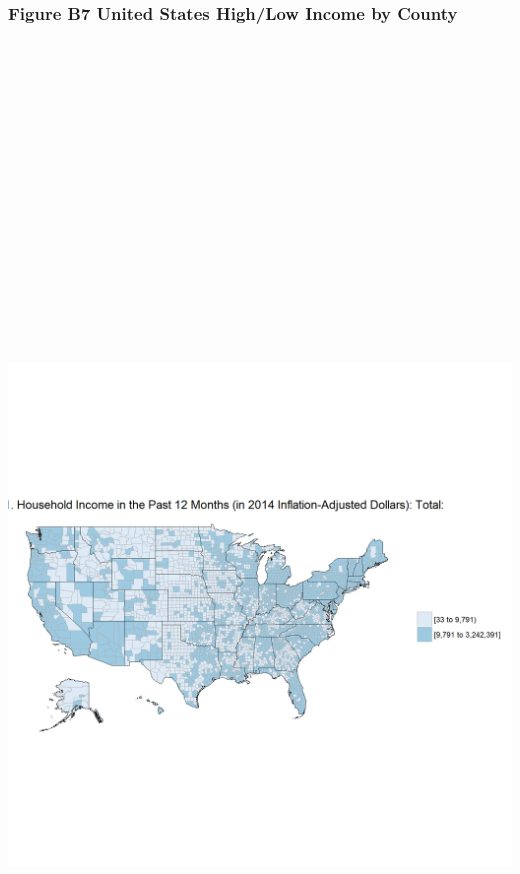 \documentclass[]{article}
\begin{document}
\newpage

\subsubsection{Figure B7 United States High/Low Income by
County}\label{figure-b7-united-states-highlow-income-by-county}

\section{\texorpdfstring{\protect\includegraphics[height=12.50000in]{images/county_income_twolvl.png}}{US High/Low Income by County}}\label{us-highlow-income-by-county}
\end{document}
